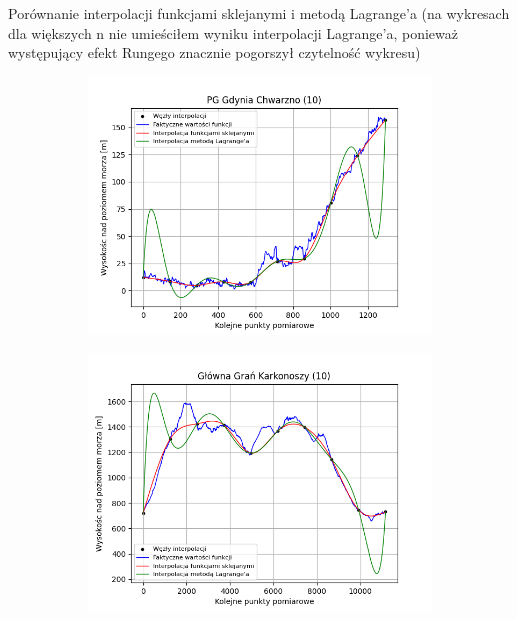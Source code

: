 \documentclass[fleqn]{article}
\begin{document}
    \noindent Porównanie interpolacji funkcjami sklejanymi i metodą Lagrange'a (na wykresach dla większych n nie umieściłem wyniku interpolacji
    Lagrange'a, ponieważ występujący efekt Rungego znacznie pogorszył czytelność wykresu)
    \begin{figure}[h]
        \centering
        \begin{subfigure}{.33\textwidth}
            \centering
            \includegraphics[width=\linewidth]{plot_10_points_PG_Gdynia_Chwarzno.png}
            \label{fig:sub1}
        \end{subfigure}
        \begin{subfigure}{.33\textwidth}
          \centering
          \includegraphics[width=\linewidth]{plot_10_points_Główna_Grań_Karkonoszy.png}

\end{subfigure}
\end{figure}
\end{document}
